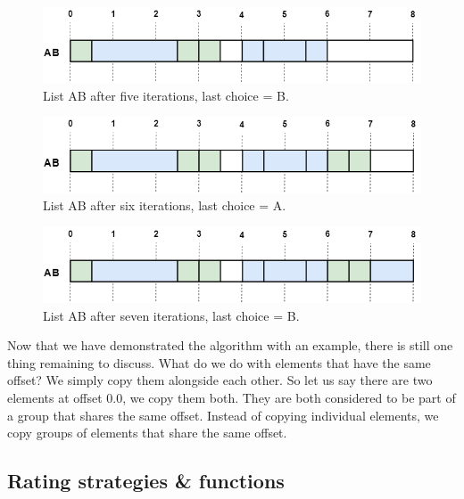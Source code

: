 \documentclass[a4paper]{article}
\begin{document}
\begin{figure}[H]
\includegraphics[width=\textwidth]{Fotos/crossover/5th.png}
\caption{List AB after five iterations, last choice = B.}
\label{fig:cross_5}
\end{figure}

\begin{figure}[H]
\includegraphics[width=\textwidth]{Fotos/crossover/6th.png}
\caption{List AB after six iterations, last choice = A.}
\label{fig:cross_6}
\end{figure}

\begin{figure}[H]
\includegraphics[width=\textwidth]{Fotos/crossover/last.png}
\caption{List AB after seven iterations, last choice = B.}
\label{fig:cross_7}
\end{figure}

Now that we have demonstrated the algorithm with an example, there is still one thing remaining to discuss. What do we do with elements that have the same offset? We simply copy them alongside each other. So let us say there are two elements at offset 0.0, we copy them both. They are both considered to be part of a group that shares the same offset. Instead of copying individual elements, we copy groups of elements that share the same offset. 

\subsection{Rating strategies \& functions} \label{sec:rating}
\end{document}

